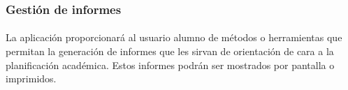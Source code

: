       \subsubsection{Gestión de informes}

      \paragraph{}La aplicación proporcionará al usuario alumno de métodos o
      herramientas que permitan la generación de informes que les sirvan de
      orientación de cara a la planificación académica. Estos informes podrán
      ser mostrados por pantalla o imprimidos.